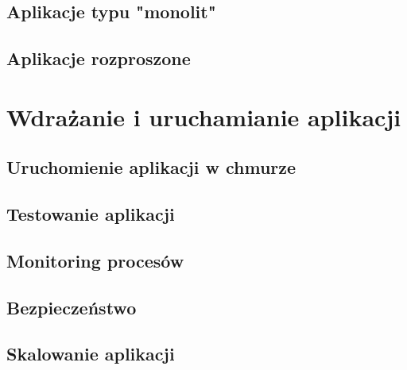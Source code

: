 \subsection{Aplikacje typu "monolit"}

\subsection{Aplikacje rozproszone}

\section{Wdrażanie i uruchamianie aplikacji}

\subsection{Uruchomienie aplikacji w chmurze}

\subsection{Testowanie aplikacji}

\subsection{Monitoring procesów}

\subsection{Bezpieczeństwo}

\subsection{Skalowanie aplikacji}
